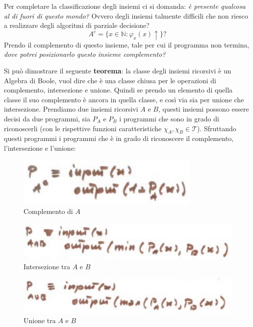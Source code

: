 \documentclass{article}
\begin{document}
Per completare la classificazione degli insiemi ci si domanda: \textit{è presente
    qualcosa al di fuori di questo mondo?} Ovvero degli insiemi talmente difficili
che non riesco a realizzare degli algoritmi di parziale decisione?
$$A^c=\{x\in\mathbb{N}:\varphi_x(x)\uparrow\}?$$
Prendo il complemento di questo insieme, tale per cui il programma non termina, \textit{dove
    potrei posizionarlo questo insieme complemento?}

Si può dimostrare il seguente \textbf{teorema}: la classe degli insiemi ricorsivi è un Algebra di Boole,
vuol dire che è una classe chiusa per le operazioni di complemento, intersezione e unione. Quindi
se prendo un elemento di quella classe il suo complemento è ancora in quella classe, e così
via sia per unione che intersezione.
Prendiamo due insiemi ricorsivi $A$ e $B$, questi insiemi possono essere decisi da due programmi,
sia $P_A$ e $P_B$ i programmi che sono in grado di riconoscerli (con
le rispettive funzioni caratteristiche $\chi_A,\chi_B\in\mathcal{T}$).
Sfruttando questi programmi i programmi che è in grado di
riconoscere il complemento, l'intersezione e l'unione:
\begin{figure}[H]
    \centering
    \includegraphics[scale=0.6]{images/compl_A.png}
    \caption{Complemento di $A$}
\end{figure}


\begin{figure}[H]
    \centering
    \includegraphics[scale=0.7]{images/intersab.png}
    \caption{Intersezione tra $A$ e $B$}
\end{figure}

\begin{figure}[H]
    \centering
    \includegraphics[scale=0.7]{images/unionab.png}
    \caption{Unione tra $A$ e $B$}
\end{figure}
\end{document}
